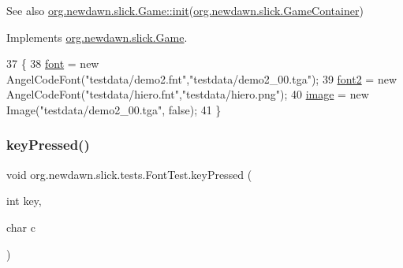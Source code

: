 \begin{DoxySeeAlso}{See also}
\mbox{\hyperlink{interfaceorg_1_1newdawn_1_1slick_1_1_game_ad2dd6affab08bb8fdb5fab0815957b7a}{org.\+newdawn.\+slick.\+Game\+::init}}(\mbox{\hyperlink{classorg_1_1newdawn_1_1slick_1_1_game_container}{org.\+newdawn.\+slick.\+Game\+Container}}) 
\end{DoxySeeAlso}


Implements \mbox{\hyperlink{interfaceorg_1_1newdawn_1_1slick_1_1_game_ad2dd6affab08bb8fdb5fab0815957b7a}{org.\+newdawn.\+slick.\+Game}}.


\begin{DoxyCode}
37                                                                     \{
38         \mbox{\hyperlink{classorg_1_1newdawn_1_1slick_1_1tests_1_1_font_test_a34bca4d491b4c3abaf2c329d0dd097ce}{font}} = \textcolor{keyword}{new} AngelCodeFont(\textcolor{stringliteral}{"testdata/demo2.fnt"},\textcolor{stringliteral}{"testdata/demo2\_00.tga"});
39         \mbox{\hyperlink{classorg_1_1newdawn_1_1slick_1_1tests_1_1_font_test_a4d866583f8bf9a64f10e51a596658726}{font2}} = \textcolor{keyword}{new} AngelCodeFont(\textcolor{stringliteral}{"testdata/hiero.fnt"},\textcolor{stringliteral}{"testdata/hiero.png"});
40         \mbox{\hyperlink{classorg_1_1newdawn_1_1slick_1_1tests_1_1_font_test_a5f77dca50346852c2daeaadfeab96b56}{image}} = \textcolor{keyword}{new} Image(\textcolor{stringliteral}{"testdata/demo2\_00.tga"}, \textcolor{keyword}{false});
41     \}
\end{DoxyCode}
\mbox{\label{classorg_1_1newdawn_1_1slick_1_1tests_1_1_font_test_a09e35f54a8e1bda5b5955881defa7614}} 
\subsubsection{\texorpdfstring{key\+Pressed()}{keyPressed()}}
{\footnotesize\ttfamily void org.\+newdawn.\+slick.\+tests.\+Font\+Test.\+key\+Pressed (\begin{DoxyParamCaption}\item[{int}]{key,  }\item[{char}]{c }\end{DoxyParamCaption})\hspace{0.3cm}{\ttfamily [inline]}}

